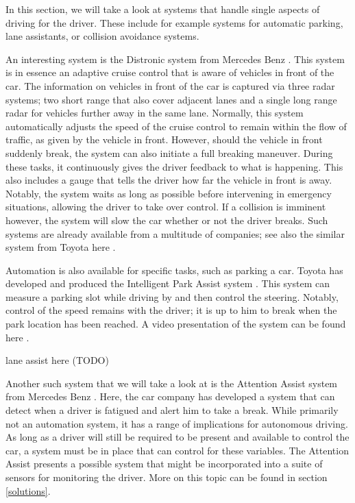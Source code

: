 \documentclass{acm_proc_article-sp}
\begin{document}
In this section, we will take a look at systems that handle single aspects of driving for the driver.
These include for example systems for automatic parking, lane assistants, or collision avoidance systems.

An interesting system is the Distronic system from Mercedes Benz \cite{www:mercedes_pre_safe}.
This system is in essence an adaptive cruise control that is aware of vehicles in front of the car.
The information on vehicles in front of the car is captured via three radar systems; two short range that also cover adjacent lanes and a single long range radar for vehicles further away in the same lane.
Normally, this system automatically adjusts the speed of the cruise control to remain within the flow of traffic, as given by the vehicle in front.
However, should the vehicle in front suddenly break, the system can also initiate a full breaking maneuver.
During these tasks, it continuously gives the driver feedback to what is happening.
This also includes a gauge that tells the driver how far the vehicle in front is away.
Notably, the system waits as long as possible before intervening in emergency situations, allowing the driver to take over control.
If a collision is imminent however, the system will slow the car whether or not the driver breaks.
Such systems are already available from a multitude of companies; see also the similar system from Toyota here \cite{www:toyota_pcs}.

Automation is also available for specific tasks, such as parking a car.
Toyota has developed and produced the Intelligent Park Assist system \cite{www:toyota_i_park_assist}.
This system can measure a parking slot while driving by and then control the steering.
Notably, control of the speed remains with the driver; it is up to him to break when the park location has been reached.
A video presentation of the system can be found here \cite{www:toyota_ipa_video}.

lane assist here (TODO)

Another such system that we will take a look at is the Attention Assist system from Mercedes Benz \cite{www:mercedes_attention_assist}.
Here, the car company has developed a system that can detect when a driver is fatigued and alert him to take a break.
While primarily not an automation system, it has a range of implications for autonomous driving.
As long as a driver will still be required to be present and available to control the car, a system must be in place that can control for these variables.
The Attention Assist presents a possible system that might be incorporated into a suite of sensors for monitoring the driver.
More on this topic can be found in section \ref{solutions}.
\end{document}
